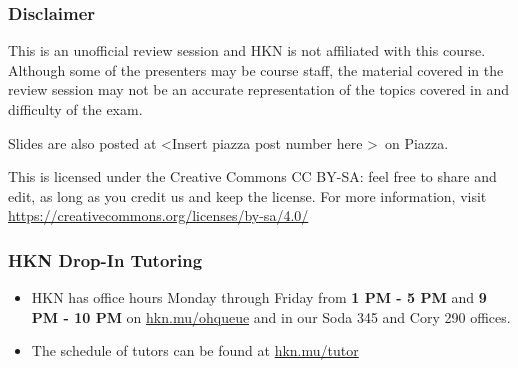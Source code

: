 \providecommand{\SlideAccessingLogistics}{\textless Insert piazza post number here \textgreater}
\providecommand{\SlidesLocation}{\textless Slides location and/or link \textgreater}
\providecommand{\PresenterHours}{\textless Itemize the presenter hours here \textgreater}

\begin{frame}

\titlepage

\end{frame}

\begin{frame}[t]\vspace{20pt}
\frametitle{Disclaimer}
This is an unofficial review session and HKN is not affiliated with this course. Although some of the presenters may be course staff, the material covered in the review session may not be an accurate representation of the topics covered in and difficulty of the exam.


Slides are also posted at \SlideAccessingLogistics\ on Piazza.

\begin{footnotesize}
  This is licensed under the Creative Commons CC BY-SA: feel free to share and edit, as long as you credit us and keep the license. For more information, visit
  \href{https://creativecommons.org/licenses/by-sa/4.0/}{https://creativecommons.org/licenses/by-sa/4.0/}
\end{footnotesize}

\vspace{20pt}

\end{frame}


\begin{frame}[t]\vspace{20pt}
\frametitle{HKN Drop-In Tutoring}

\begin{itemize}
  \item HKN has office hours Monday through Friday from \textbf{1 PM - 5 PM} and \textbf{9 PM - 10 PM} on \href{https://hkn.mu/ohqueue}{hkn.mu/ohqueue} and in our Soda 345 and Cory 290 offices.
  \item The schedule of tutors can be found at \href{https://hkn.mu/tutor}{hkn.mu/tutor}
\end{itemize}

\end{frame}
